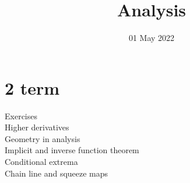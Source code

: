 
\title{Analysis}
\author{}
\date{01 May 2022}

\maketitle
\section{2 term}
\begin{description}
    \item[Exercises] 
    \item[Higher derivatives] 
    \item[Geometry in analysis]  
    \item[Implicit and inverse function theorem] 
    \item[Conditional extrema]  
    \item[Chain line and squeeze maps]  
\end{description}
